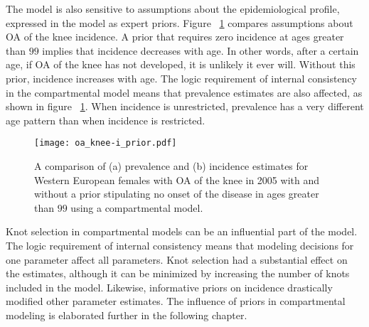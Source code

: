 The model is also sensitive to assumptions about the epidemiological
profile, expressed in the model as expert priors.  Figure
~\ref{fig:app-oa knee priors} compares assumptions about OA of the knee
incidence.  A prior that requires zero incidence at ages greater than
$99$ implies that incidence decreases with age.  In other words, after a
certain age, if OA of the knee has not developed, it is unlikely it ever
will. Without this prior, incidence increases with age.  The logic
requirement of internal consistency in the compartmental model means
that prevalence estimates are also affected, as shown in figure
~\ref{fig:app-oa knee priors}.  When incidence is unrestricted,
prevalence has a very different age pattern than when incidence is
restricted.

    \begin{figure}[h]
        \begin{center}
            \texttt{[image: oa\_knee-i\_prior.pdf]}
            \caption[Comparison of osteoarthritis of the knee estimates 
              with and without a prior restricting the age of onset.]{A comparison 
              of (a) prevalence and (b) incidence estimates
              for Western European females
              with OA of the knee in 2005 with and
              without a prior stipulating no onset of the disease in
              ages greater than $99$ using a compartmental model.}
            \label{fig:app-oa knee priors}
        \end{center}
    \end{figure}

Knot selection in compartmental models can be an influential part of
the model.  The logic requirement of internal consistency means that
modeling decisions for one parameter affect all parameters.  Knot
selection had a substantial effect on the estimates, although it can
be minimized by increasing the number of knots included in the model.
Likewise, informative priors on incidence drastically modified other
parameter estimates.  The influence of priors in compartmental
modeling is elaborated further in the following chapter.
